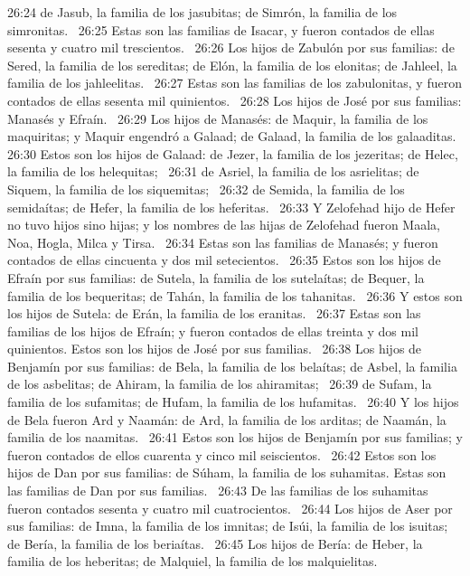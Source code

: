 26:24 de Jasub, la familia de los jasubitas; de Simrón, la familia de los simronitas.  
26:25 Estas son las familias de Isacar, y fueron contados de ellas sesenta y cuatro mil trescientos.  
26:26 Los hijos de Zabulón por sus familias: de Sered, la familia de los sereditas; de Elón, la familia de los elonitas; de Jahleel, la familia de los jahleelitas.  
26:27 Estas son las familias de los zabulonitas, y fueron contados de ellas sesenta mil quinientos.  
26:28 Los hijos de José por sus familias: Manasés y Efraín.  
26:29 Los hijos de Manasés: de Maquir, la familia de los maquiritas; y Maquir engendró a Galaad; de Galaad, la familia de los galaaditas.  
26:30 Estos son los hijos de Galaad: de Jezer, la familia de los jezeritas; de Helec, la familia de los helequitas;  
26:31 de Asriel, la familia de los asrielitas; de Siquem, la familia de los siquemitas;  
26:32 de Semida, la familia de los semidaítas; de Hefer, la familia de los heferitas.  
26:33 Y Zelofehad hijo de Hefer no tuvo hijos sino hijas; y los nombres de las hijas de Zelofehad fueron Maala, Noa, Hogla, Milca y Tirsa.  
26:34 Estas son las familias de Manasés; y fueron contados de ellas cincuenta y dos mil setecientos.  
26:35 Estos son los hijos de Efraín por sus familias: de Sutela, la familia de los sutelaítas; de Bequer, la familia de los bequeritas; de Tahán, la familia de los tahanitas.  
26:36 Y estos son los hijos de Sutela: de Erán, la familia de los eranitas.  
26:37 Estas son las familias de los hijos de Efraín; y fueron contados de ellas treinta y dos mil quinientos. Estos son los hijos de José por sus familias.  
26:38 Los hijos de Benjamín por sus familias: de Bela, la familia de los belaítas; de Asbel, la familia de los asbelitas; de Ahiram, la familia de los ahiramitas;  
26:39 de Sufam, la familia de los sufamitas; de Hufam, la familia de los hufamitas.  
26:40 Y los hijos de Bela fueron Ard y Naamán: de Ard, la familia de los arditas; de Naamán, la familia de los naamitas.  
26:41 Estos son los hijos de Benjamín por sus familias; y fueron contados de ellos cuarenta y cinco mil seiscientos.  
26:42 Estos son los hijos de Dan por sus familias: de Súham, la familia de los suhamitas. Estas son las familias de Dan por sus familias.  
26:43 De las familias de los suhamitas fueron contados sesenta y cuatro mil cuatrocientos.  
26:44 Los hijos de Aser por sus familias: de Imna, la familia de los imnitas; de Isúi, la familia de los isuitas; de Bería, la familia de los beriaítas.  
26:45 Los hijos de Bería: de Heber, la familia de los heberitas; de Malquiel, la familia de los malquielitas.  
